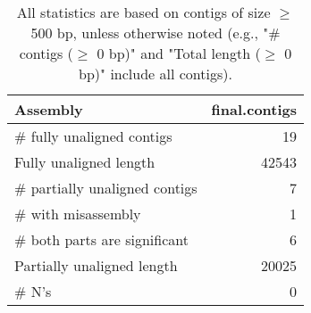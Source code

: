\documentclass[12pt,a4paper]{article}
\begin{document}
\begin{table}[ht]
\begin{center}
\caption{All statistics are based on contigs of size $\geq$ 500 bp, unless otherwise noted (e.g., "\# contigs ($\geq$ 0 bp)" and "Total length ($\geq$ 0 bp)" include all contigs).}
\begin{tabular}{|l*{1}{|r}|}
\hline
Assembly & final.contigs \\ \hline
\# fully unaligned contigs & 19 \\ \hline
Fully unaligned length & 42543 \\ \hline
\# partially unaligned contigs & 7 \\ \hline
\hspace{5mm}\# with misassembly & 1 \\ \hline
\hspace{5mm}\# both parts are significant & 6 \\ \hline
Partially unaligned length & 20025 \\ \hline
\# N's & 0 \\ \hline
\end{tabular}
\end{center}
\end{table}
\end{document}
